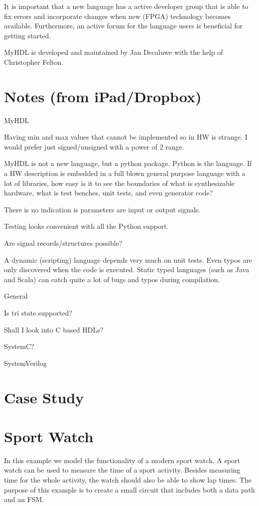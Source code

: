 \documentclass[a4paper, conference]{IEEEtran}
\begin{document}
It is important that a new language has a active developer group that is
able to fix errors and incorporate changes when new (FPGA) technology
becomes available. Furthermore, an active forum for the language users
is beneficial for getting started.

MyHDL is developed and maintained by Jan Decaluwe with the help of
Christopher Felton.  

\section{Notes (from iPad/Dropbox)}

MyHDL

Having min and max values that cannot be implemented so in HW is strange. I would prefer just signed/unsigned with a power of 2 range.

MyHDL is not a new language, but a python package. Python is the language. If a HW description is embedded in a full blown general purpose language with a lot of libraries, how easy is it to see the boundaries of what is synthesizable hardware, what is test benches, unit tests, and even generator code?

There is no indication is parameters are input or output signals.

Testing looks convenient with all the Python support.

Are signal records/structures possible?

A dynamic (scripting) language depends very much on unit tests. Even typos are only
discovered when the code is executed. Static typed languages (such as Java
and Scala) can catch quite a lot of bugs and typos during compilation.

General

Is tri state supported?

Shall I look into C based HDLs?

SystemC?

SystemVerilog

\section{Case Study}

\section{Sport Watch}
In this example we model the functionality of a modern sport
watch. A sport watch can be used to 
measure the time of a sport activity. Besides measuring time for the
whole activity, the watch should also be able to show lap times. The
purpose of this example is to create a small circuit that includes both
a data path and an FSM.
\end{document}
